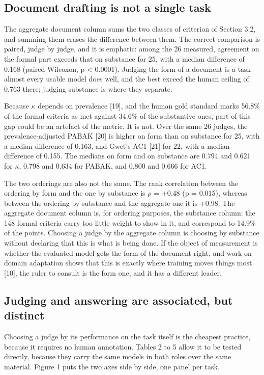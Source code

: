 \documentclass{IOS-Book-Article}
\begin{document}
\subsection{Document drafting is not a single task}

The aggregate document column sums the two classes of criterion of Section 3.2, and summing them erases the difference between them. The correct comparison is paired, judge by judge, and it is emphatic: among the 26 measured, agreement on the formal part exceeds that on substance for 25, with a median difference of 0.168 (paired Wilcoxon, p < 0.0001). Judging the form of a document is a task almost every usable model does well, and the best exceed the human ceiling of 0.763 there; judging substance is where they separate.

Because $\kappa$ depends on prevalence [19], and the human gold standard marks 56.8\% of the formal criteria as met against 34.6\% of the substantive ones, part of this gap could be an artefact of the metric. It is not. Over the same 26 judges, the prevalence-adjusted PABAK [20] is higher on form than on substance for 25, with a median difference of 0.163, and Gwet's AC1 [21] for 22, with a median difference of 0.155. The medians on form and on substance are 0.794 and 0.621 for $\kappa$, 0.798 and 0.634 for PABAK, and 0.800 and 0.666 for AC1.

The two orderings are also not the same. The rank correlation between the ordering by form and the one by substance is $\rho$ = +0.48 (p = 0.015), whereas between the ordering by substance and the aggregate one it is +0.98. The aggregate document column is, for ordering purposes, the substance column: the 148 formal criteria carry too little weight to show in it, and correspond to 14.9\% of the points. Choosing a judge by the aggregate column is choosing by substance without declaring that this is what is being done. If the object of measurement is whether the evaluated model gets the form of the document right, and work on domain adaptation shows that this is exactly where training moves things most [10], the ruler to consult is the form one, and it has a different leader.

\subsection{Judging and answering are associated, but distinct}

Choosing a judge by its performance on the task itself is the cheapest practice, because it requires no human annotation. Tables 2 to 5 allow it to be tested directly, because they carry the same models in both roles over the same material. Figure 1 puts the two axes side by side, one panel per task.
\end{document}
